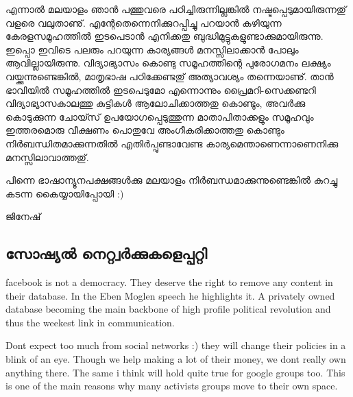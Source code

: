 എന്നാല്‍ മലയാളം ഞാന്‍ പത്തുവരെ പഠിച്ചിരുന്നില്ലങ്കില്‍
നഷ്ടപ്പെടുമായിരുന്നതു് വളരെ വലുതാണു്. എന്റേതെന്നെനിക്കുറപ്പിച്ചു
പറയാന്‍ കഴിയുന്ന കേരളസമൂഹത്തില്‍ ഇടപെടാന്‍ എനിക്കതു
ബുദ്ധിമുട്ടുകളുണ്ടാക്കുമായിരുന്നു. ഇപ്പൊ ഇവിടെ പലരും പറയുന്ന
കാര്യങ്ങള്‍ മനസ്സിലാക്കാന്‍ പോലും ആവില്ലായിരുന്നു. വിദ്യാഭ്യാസം കൊണ്ടു
സമൂഹത്തിന്റെ പുരോഗമനം ലക്ഷ്യം വയ്ക്കുന്നുണ്ടെങ്കില്‍, മാതൃഭാഷ
പഠിക്കേണ്ടതു് അത്യാവശ്യം തന്നെയാണു്. താന്‍ ഭാവിയില്‍ സമൂഹത്തില്‍
ഇടപെടുമോ എന്നൊന്നും പ്രൈമറി-സെക്കണ്ടറി വിദ്യാഭ്യാസകാലത്തു കുട്ടികള്‍
ആലോചിക്കാത്തതു കൊണ്ടും, അവര്‍ക്കു കൊടുക്കുന്ന ചോയ്സ്
ഉപയോഗപ്പെടുത്തുന്ന മാതാപിതാക്കളും സമൂഹവും ഇത്തരമൊരു വീക്ഷണം പൊതുവേ
അംഗീകരിക്കാത്തതു കൊണ്ടും നിര്‍ബന്ധിതമാക്കുന്നതില്‍ എതിര്‍പ്പുണ്ടാവേണ്ട
കാര്യമെന്താണെന്നാണെനിക്കു മനസ്സിലാവാത്തതു്.

പിന്നെ ഭാഷാന്യൂനപക്ഷങ്ങള്‍ക്കു മലയാളം നിര്‍ബന്ധമാക്കുന്നുണ്ടെങ്കില്‍
കുറച്ചു കടന്ന കൈയ്യായിപ്പോയി :)

ജിനേഷ്

\subsection*{സോഷ്യല്‍ നെറ്റ്വര്‍ക്കുകളെപ്പറ്റി }
\begin{english}

facebook is not a democracy. They deserve the right to remove any
content in their database. In the Eben Moglen speech he highlights it.
A privately owned database becoming the main backbone of high profile
political revolution and thus the weekest link in communication.

Dont expect too much from social networks :) they will change their
policies in a blink of an eye. Though we help making a lot of their
money, we dont really own anything there. The same i think will hold
quite true for google groups too. This is one of the main reasons why
many activists groups move to their own space.

\end{english}

